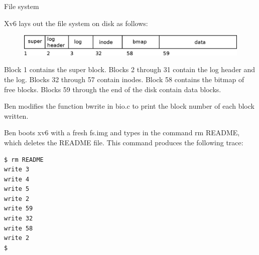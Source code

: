 \documentclass[11pt]{exam}
\begin{document}
\begin{questions}

\addpoints
\question File system


Xv6 lays out the file system on disk as follows:

\begin{figure}[h] \centering
  \includegraphics[width=0.8\columnwidth]{figs/fs}
  \label{fig:ramengine-decomposed-app}

\end{figure}

Block 1 contains the super block. Blocks 2 through 31 contain the log header
and the log. Blocks 32 through 57 contain inodes. Block 58 contains the bitmap
of free blocks. Blocks 59 through the end of the disk contain data blocks.

Ben modifies the function bwrite in bio.c to print the block number of each
block written.

Ben boots xv6 with a fresh fs.img and types in the
command rm README, which deletes the README file.
This command produces the following trace:

\begin{verbatim} 
$ rm README
write 3
write 4
write 5
write 2
write 59
write 32
write 58
write 2
$
\end{verbatim}

\end{questions}
\end{document}
